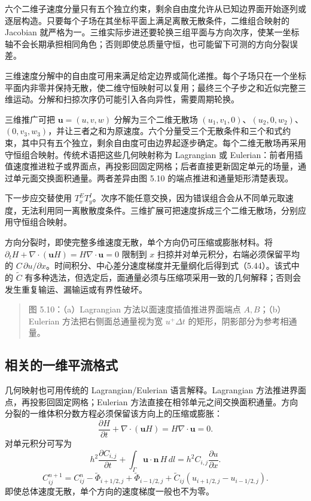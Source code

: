 \documentclass[11pt,a4paper,openany,fontset=none]{ctexbook}
\begin{document}
六个二维子速度分量只有五个独立约束，剩余自由度允许从已知边界面开始逐列或逐层构造。只要每个子场在其坐标平面上满足离散无散条件，二维组合映射的 Jacobian 就严格为一。三维实际步进还要轮换三组平面与方向次序，使某一坐标轴不会长期承担相同角色；否则即使总质量守恒，也可能留下可测的方向分裂误差。

三维速度分解中的自由度可用来满足给定边界或简化递推。每个子场只在一个坐标平面内非零并保持无散，使二维守恒映射可以复用；最终三个子步之和近似完整三维运动。分解和扫掠次序仍可能引入各向异性，需要周期轮换。

三维推广可把 $\bm u=(u,v,w)$ 分解为三个二维无散场 $(u_1,v_1,0)$、$(u_2,0,w_2)$、$(0,v_3,w_3)$，并让三者之和为原速度。六个分量受三个无散条件和三个和式约束，其中只有五个独立，剩余自由度可由边界起逐步确定。每个二维无散场再采用守恒组合映射。传统术语把这些几何映射称为 Lagrangian 或 Eulerian：前者用插值速度推进粒子或界面点，再投影回固定网格；后者直接更新固定单元的场量，通过单元面交换面积通量。两者差异由图 5.10 的端点推进和通量矩形清楚表现。

下一步应交替使用 $T_x^ET_y^I$。次序不能任意交换，因为错误组合会从不同单元取速度，无法利用同一离散散度条件。三维扩展可把速度拆成三个二维无散场，分别应用守恒组合映射。

方向分裂时，即使完整多维速度无散，单个方向仍可压缩或膨胀材料。将 $\partial_tH+\nabla\cdot(\bm uH)=H\nabla\cdot\bm u=0$ 限制到 $x$ 扫掠并对单元积分，右端必须保留平均的 $C\,\partial u/\partial x$。时间积分、中心差分速度梯度并无量纲化后得到式（5.44）。该式中的 $\widetilde C$ 有多种选法，但选定后，面通量必须与压缩项采用一致的几何解释；否则会发生重复输运、漏输运或有界性破坏。

\begin{quote}\small 图 5.10：（a）Lagrangian 方法以面速度插值推进界面端点 $A,B$；（b）Eulerian 方法把右侧面总通量视为宽 $u^+\Delta t$ 的矩形，阴影部分为参考相通量。\end{quote}
\subsection{相关的一维平流格式}

几何映射也可用传统的 Lagrangian/Eulerian 语言解释。Lagrangian 方法推进界面点，再投影回固定网格；Eulerian 方法直接在相邻单元之间交换面积通量。方向分裂的一维体积分数方程必须保留该方向上的压缩或膨胀：
\begin{equation}
\frac{\partial H}{\partial t}+\nabla\cdot(\bm uH)=H\nabla\cdot\bm u=0.
\tag{5.42}
\end{equation}
对单元积分可写为
\begin{equation}
h^2\frac{\partial C_{i,j}}{\partial t}
+\int_\Gamma \bm u\cdot\bm n\,H\,dl
=h^2C_{i,j}\frac{\partial u}{\partial x}.
\tag{5.43}
\end{equation}
\begin{equation}
C_{ij}^{n+1}=C_{ij}^n-\widetilde\Phi_{i+1/2,j}+\widetilde\Phi_{i-1/2,j}
+\widetilde C_{ij}(u_{i+1/2,j}-u_{i-1/2,j}).
\tag{5.44}
\end{equation}
即使总体速度无散，单个方向的速度梯度一般也不为零。
\end{document}
